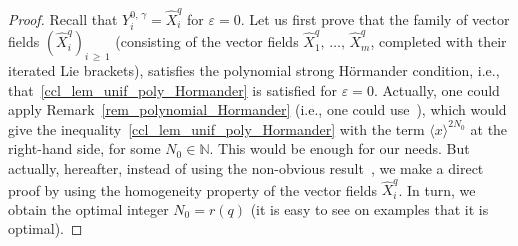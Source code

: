 \documentclass[AHL,Unicode,published]{cedram}
\newcommand*\N{\mathbb{N}}
\renewcommand{\geq}{\geqslant}
\begin{document}
\begin{proof}
Recall that $Y_i^{0,\,\gamma}= \widehat{X}_i^{q}$ for $\varepsilon=0$. Let us first prove that the family of vector fields $(\widehat{X}_i^{q})_{i\,\geq\,1}$ (consisting of the vector fields $\widehat{X}_1^{q},\,\ldots,\,\widehat{X}_m^{q}$, completed with their iterated Lie brackets), satisfies the polynomial strong H\"ormander condition, i.e., that~\eqref{ccl_lem_unif_poly_Hormander} is satisfied for $\varepsilon=0$. Actually, one could apply Remark~\ref{rem_polynomial_Hormander} (i.e., one could use~\cite[Lemma~2]{Ho-58}), which would give the inequality~\eqref{ccl_lem_unif_poly_Hormander} with the term $\langle x\rangle^{2N_0}$ at the right-hand side, for some $N_0\in\N$. This would be enough for our needs. But actually, hereafter, instead of using the non-obvious result~\cite[Lemma~2]{Ho-58}, we make a direct proof by using the homogeneity property of the vector fields $\widehat{X}_i^{q}$. In turn, we obtain the optimal integer $N_0=r(q)$ (it is easy to see on examples that it is optimal).


\end{proof}
\end{document}
